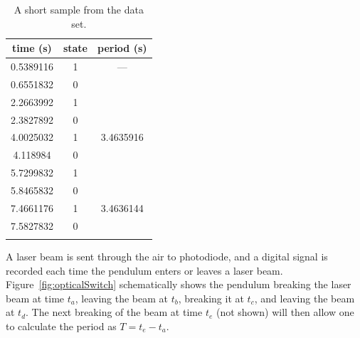\begin{prob}
\begin{table}
\caption{A short sample from the data set.}\label{tab:data}
\vspace*{3mm}
\begin{tabular}{ccc}
\toprule
time (s)			& state	& period (s)\\
\midrule
0.5389116	& \hspace*{5mm}1	\hspace*{5mm} & ---\\
0.6551832	&	\hspace*{5mm}0	\hspace*{5mm} &\\
2.2663992	&	\hspace*{5mm}1	\hspace*{5mm} &\\
2.3827892	&	\hspace*{5mm}0	 \hspace*{5mm}&\\
4.0025032	&	\hspace*{5mm}1	 \hspace*{5mm}&	3.4635916\\
4.118984	&	\hspace*{5mm}0	\hspace*{5mm} & \\
5.7299832	&\hspace*{5mm}1	\hspace*{5mm} &	 \\
5.8465832	&\hspace*{5mm}0 \hspace*{5mm} &	 \\
7.4661176	&\hspace*{5mm}1	 \hspace*{5mm}& 3.4636144\\
7.5827832	&\hspace*{5mm}0	\hspace*{5mm} & \\
\bottomrule
\vspace*{4mm}
\end{tabular}
\end{table}
A laser beam is sent through the air to photodiode, and a digital signal is recorded each time the pendulum enters or leaves a laser beam. Figure~\ref{fig:opticalSwitch} schematically shows the pendulum breaking the laser beam at time $t_a$, leaving the beam at $t_b$, breaking it at $t_c$, and leaving the beam at $t_d$. The next breaking of the beam at time $t_e$ (not shown) will then allow one to calculate the period as $T = t_e - t_a$. 


\end{prob}
